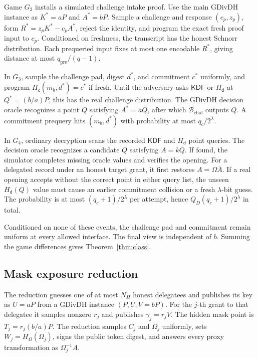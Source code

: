 \documentclass[11pt,letterpaper]{article}
\theoremstyle{definition}
\theoremstyle{remark}
\newcommand{\KDF}{\ensuremath{\mathsf{KDF}}}
\newcommand{\Hd}{\ensuremath{H_{\mathsf d}}}
\newcommand{\Hc}{\ensuremath{H_{\mathsf c}}}
\newcommand{\HOmega}{\ensuremath{H_{\Omega}}}
\begin{document}
Game \(G_2\) installs a simulated challenge intake proof.  Use the main GDivDH
instance as \(K^*=aP\) and \(A^*=bP\).  Sample a challenge and response
\((c_p,z_p)\), form
\(R^*=z_pK^*-c_pA^*\), reject the identity, and program the exact fresh proof
input to \(c_p\).  Conditioned on freshness, the transcript has the honest
Schnorr distribution.  Each prequeried input fixes at most one encodable
\(R^*\), giving distance at most \(q_{\mathrm{pre}}/(q-1)\).

In \(G_3\), sample the challenge pad, digest \(d^*\), and commitment \(c^*\)
uniformly, and program \(\Hc(m_b,d^*)=c^*\) if fresh.  Until the adversary asks
\(\KDF\) or \(\Hd\) at \(Q^*=(b/a)P\), this has the real challenge
distribution.  The GDivDH decision oracle recognizes a point \(Q\) satisfying
\(A^*=aQ\), after which \(\mathcal B_{\mathrm{chal}}\) outputs \(Q\).  A
commitment prequery hits \((m_b,d^*)\) with probability at most
\(q_c/2^\lambda\).

In \(G_4\), ordinary decryption scans the recorded \(\KDF\) and \(\Hd\) point
queries.  The decision oracle recognizes a candidate \(Q\) satisfying \(A=kQ\).
If found, the simulator completes missing oracle values and verifies the opening.
For a delegated record under an honest target grant, it first restores
\(A=\Omega\bar A\).  If a real opening accepts without the correct point in
either query list, the unseen \(\Hd(Q)\) value must cause an earlier commitment
collision or a fresh \(\lambda\)-bit guess.  The probability is at most
\((q_c+1)/2^\lambda\) per attempt, hence
\(Q_D(q_c+1)/2^\lambda\) in total.

Conditioned on none of these events, the challenge pad and commitment remain
uniform at every allowed interface.  The final view is independent of \(b\).
Summing the game differences gives Theorem~\ref{thm:class}.

\subsection{Mask exposure reduction}
\label{sec:mask}

The reduction guesses one of at most \(N_H\) honest delegatees and publishes its
key as \(U=aP\) from a GDivDH instance \((P,U,V=bP)\).  For the \(j\)-th grant to
that delegatee it samples nonzero \(r_j\) and publishes
\(\gamma_j=r_jV\).  The hidden mask point is
\(T_j=r_j(b/a)P\).  The reduction samples \(C_j\) and \(\Omega_j\) uniformly,
sets \(W_j=\HOmega(\Omega_j)\), signs the public token digest, and answers every
proxy transformation as \(\Omega_j^{-1}A\).
\end{document}
